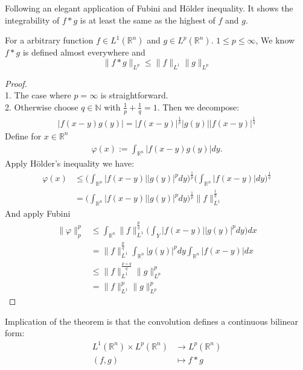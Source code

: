Following an elegant application of Fubini and H\"older inequality. It shows the integrability of $f*g$ is at least the same as the highest of $f$ and $g$. 
\begin{theorem}
For a arbitrary function $f\in L^1(\mathbb{R}^n)$ and $g \in L^p(\mathbb{R}^n)$. $1 \leq p \leq \infty$, We know $f*g$ is defined almost everywhere and
	\begin{equation*}
		\|f * g\|_{L^p} \leq \|f\|_{L^1} \|g\|_{L^p}
	\end{equation*}
\end{theorem}
\begin{proof}\quad\\
	1. The case where $p = \infty$ is straightforward.\\ 
	2. Otherwise choose $q \in \mathbb{N}$ with $\frac{1}{p} + \frac{1}{q}= 1$. Then we decompose:
	\begin{align*}
		|f(x - y)g(y)| = |f(x-y)|^{\frac{1}{p}}|g(y)||f(x-y)|^{\frac{1}{q}}
	\end{align*} 
	Define for $x \in \mathbb{R}^n$
	\begin{align*}
		\varphi(x):= \int_{\mathbb{R}^n} |f(x - y) g(y)| dy. 
	\end{align*}
	Apply H\"older's inequality we have:
	\begin{align*}
		\varphi(x) 
		&\leq \bigg(\int_{\mathbb{R}^n} |f(x-y)||g(y)|^p dy\bigg)^{\frac{1}{p}} \bigg(\int_{\mathbb{R}^n} |f(x - y)| dy \bigg)^\frac{1}{q}\\
		&= \bigg(\int_{\mathbb{R}^n} |f(x-y)||g(y)|^p dy\bigg)^{\frac{1}{p}} \|f\|^{\frac{1}{q}}_{L^1}
	\end{align*}
	And apply Fubini
	\begin{align*}
		\|\varphi\|^p_p 
		&\leq \int_{\mathbb{R}^n} \|f\|^{\frac{p}{q}}_{L^1} \bigg(\int_Y |f(x-y)||g(y)|^p dy\bigg) dx\\
		&= \|f\|^\frac{p}{q}_{L^1} \int_{\mathbb{R}^n} |g(y)|^p dy \int_{\mathbb{R}^n} |f(x-y)|dx\\
		&\leq \|f\|^{\frac{p+q}{q}}_{L^1} \|g\|_{L^p}^p\\
		&= \|f\|^p_{L^1} \|g\|_{L^p}^p
	\end{align*}
\end{proof}
\begin{remark}
Implication of the theorem is that the convolution defines a continuous bilinear form:
\begin{align*}
	L^1(\mathbb{R}^n) \times L^p(\mathbb{R}^n) &\rightarrow L^p(\mathbb{R}^n)\\
	(f, g) &\mapsto f * g
\end{align*}	
\end{remark}


